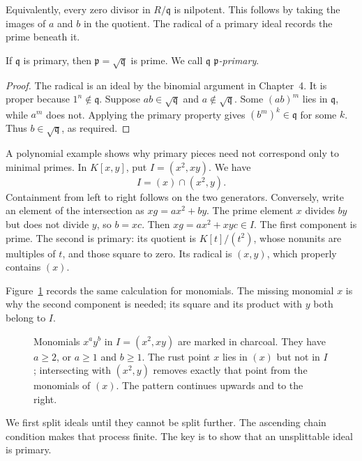 Equivalently, every zero divisor in $R/\mathfrak q$ is nilpotent. This follows by taking the images of $a$ and $b$ in the quotient. The radical of a primary ideal records the prime beneath it.

\begin{lemma}\label{lem:primaryradical}
If $\mathfrak q$ is primary, then $\mathfrak p=\sqrt{\mathfrak q}$ is prime. We call $\mathfrak q$ \emph{$\mathfrak p$-primary}.
\end{lemma}

\begin{proof}
The radical is an ideal by the binomial argument in Chapter~4. It is proper because $1^n\notin\mathfrak q$. Suppose $ab\in\sqrt{\mathfrak q}$ and $a\notin\sqrt{\mathfrak q}$. Some $(ab)^m$ lies in $\mathfrak q$, while $a^m$ does not. Applying the primary property gives $(b^m)^k\in\mathfrak q$ for some $k$. Thus $b\in\sqrt{\mathfrak q}$, as required.
\end{proof}

A polynomial example shows why primary pieces need not correspond only to minimal primes. In $K[x,y]$, put $I=(x^2,xy)$. We have
\[
 I=(x)\cap(x^2,y).
\]
Containment from left to right follows on the two generators. Conversely, write an element of the intersection as $xg=ax^2+by$. The prime element $x$ divides $by$ but does not divide $y$, so $b=xc$. Then $xg=ax^2+xyc\in I$. The first component is prime. The second is primary: its quotient is $K[t]/(t^2)$, whose nonunits are multiples of $t$, and those square to zero. Its radical is $(x,y)$, which properly contains $(x)$.

Figure~\ref{fig:v10new-ch05-primary} records the same calculation for monomials. The missing monomial $x$ is why the second component is needed; its square and its product with $y$ both belong to $I$.

\begin{figure}[ht]
\centering
{}
\caption{Monomials $x^ay^b$ in $I=(x^2,xy)$ are marked in charcoal. They have $a\ge2$, or $a\ge1$ and $b\ge1$. The rust point $x$ lies in $(x)$ but not in $I$; intersecting with $(x^2,y)$ removes exactly that point from the monomials of $(x)$. The pattern continues upwards and to the right.}
\label{fig:v10new-ch05-primary}
\end{figure}

We first split ideals until they cannot be split further. The ascending chain condition makes that process finite. The key is to show that an unsplittable ideal is primary.

